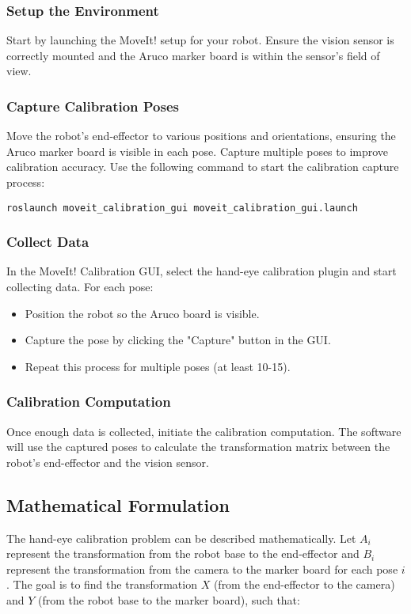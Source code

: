 \subsubsection{Setup the Environment}
Start by launching the MoveIt! setup for your robot. Ensure the vision sensor is correctly mounted and the Aruco marker board is within the sensor’s field of view.

\subsubsection{Capture Calibration Poses}
Move the robot’s end-effector to various positions and orientations, ensuring the Aruco marker board is visible in each pose. Capture multiple poses to improve calibration accuracy. Use the following command to start the calibration capture process:
\begin{verbatim}
roslaunch moveit_calibration_gui moveit_calibration_gui.launch
\end{verbatim}

\subsubsection{Collect Data}
In the MoveIt! Calibration GUI, select the hand-eye calibration plugin and start collecting data. For each pose:
\begin{itemize}
    \item Position the robot so the Aruco board is visible.
    \item Capture the pose by clicking the "Capture" button in the GUI.
    \item Repeat this process for multiple poses (at least 10-15).
\end{itemize}

\subsubsection{Calibration Computation}
Once enough data is collected, initiate the calibration computation. The software will use the captured poses to calculate the transformation matrix between the robot’s end-effector and the vision sensor.

\subsection{Mathematical Formulation}
The hand-eye calibration problem can be described mathematically. Let \( A_i \) represent the transformation from the robot base to the end-effector and \( B_i \) represent the transformation from the camera to the marker board for each pose \( i \). The goal is to find the transformation \( X \) (from the end-effector to the camera) and \( Y \) (from the robot base to the marker board), such that:

